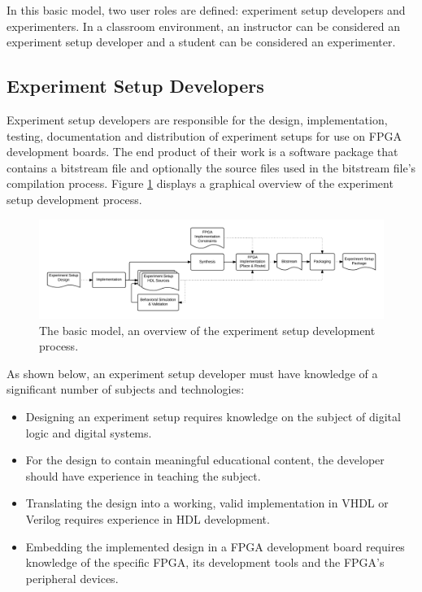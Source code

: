 \documentclass[openright]{template/uva-bachelor-thesis}
\begin{document}
In this basic model, two user roles are defined: experiment setup developers and experimenters. In a classroom environment, an instructor can be considered an experiment setup developer and a student can be considered an experimenter. 

\subsection{Experiment Setup Developers}
\label{sectionexperimentdevelopers}
Experiment setup developers are responsible for the design, implementation, testing, documentation and distribution of experiment setups for use on FPGA development boards. The end product of their work is a software package that contains a bitstream file and optionally the source files used in the bitstream file's compilation process. Figure \ref{fig:process-development-basic} displays a graphical overview of the experiment setup development process. 

\begin{figure}[h]
    \centering
    \includegraphics[width=\textwidth]{img/processes-basic-development}
    \caption{The basic model, an overview of the experiment setup development process.}
    \label{fig:process-development-basic}
\end{figure}


As shown below, an experiment setup developer must have knowledge of a significant number of subjects and technologies: 

\begin{itemize}
\item Designing an experiment setup requires knowledge on the subject of digital logic and digital systems. 
\item For the design to contain meaningful educational content, the developer should have experience in teaching the subject. 
\item Translating the design into a working, valid implementation in VHDL or Verilog requires experience in HDL development.
\item Embedding the implemented design in a FPGA development board requires knowledge of the specific FPGA, its development tools and the FPGA's peripheral devices.
\end{itemize}
\end{document}
